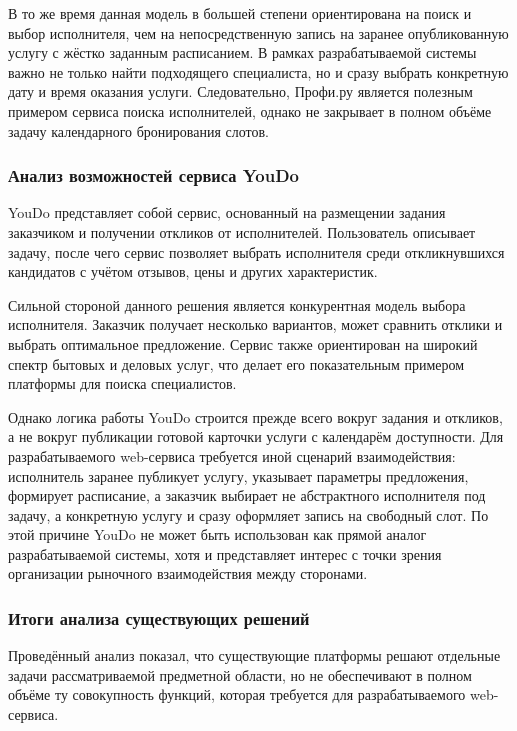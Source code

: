 В то же время данная модель в большей степени ориентирована на поиск и выбор исполнителя, чем на непосредственную запись на заранее опубликованную услугу с жёстко заданным расписанием. В рамках разрабатываемой системы важно не только найти подходящего специалиста, но и сразу выбрать конкретную дату и время оказания услуги. Следовательно, Профи.ру является полезным примером сервиса поиска исполнителей, однако не закрывает в полном объёме задачу календарного бронирования слотов.

\subsubsection{Анализ возможностей сервиса YouDo}

YouDo представляет собой сервис, основанный на размещении задания заказчиком и получении откликов от исполнителей. Пользователь описывает задачу, после чего сервис позволяет выбрать исполнителя среди откликнувшихся кандидатов с учётом отзывов, цены и других характеристик.

Сильной стороной данного решения является конкурентная модель выбора исполнителя. Заказчик получает несколько вариантов, может сравнить отклики и выбрать оптимальное предложение. Сервис также ориентирован на широкий спектр бытовых и деловых услуг, что делает его показательным примером платформы для поиска специалистов.

Однако логика работы YouDo строится прежде всего вокруг задания и откликов, а не вокруг публикации готовой карточки услуги с календарём доступности. Для разрабатываемого web-сервиса требуется иной сценарий взаимодействия: исполнитель заранее публикует услугу, указывает параметры предложения, формирует расписание, а заказчик выбирает не абстрактного исполнителя под задачу, а конкретную услугу и сразу оформляет запись на свободный слот. По этой причине YouDo не может быть использован как прямой аналог разрабатываемой системы, хотя и представляет интерес с точки зрения организации рыночного взаимодействия между сторонами.

\subsubsection{Итоги анализа существующих решений}

Проведённый анализ показал, что существующие платформы решают отдельные задачи рассматриваемой предметной области, но не обеспечивают в полном объёме ту совокупность функций, которая требуется для разрабатываемого web-сервиса.

